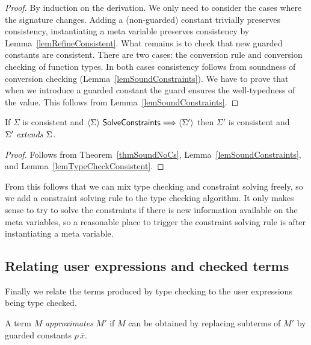 \begin{proof}
\if {}
    By induction on the derivation. We only need to consider the cases where
    the signature changes. Adding a (non-guarded) constant trivially preserves
    consistency, instantiating a meta variable preserves consistency by
    Lemma~\ref{lemRefineConsistent}. What remains is to check that new guarded
    constants are consistent. There are two cases: the conversion rule and
    conversion checking of function types. In both cases consistency follows
    from soundness of conversion checking (Lemma~\ref{lemSoundConstraints}).
\else
    We have to prove that when we introduce a guarded constant the guard
    ensures the well-typedness of the value. This follows from
    Lemma~\ref{lemSoundConstraints}.
\fi
\end{proof}

\begin{lemma} \label{lemSolveConsistent}
    If $\Sigma$ is consistent and $\langle {\Sigma} \rangle ~ {\mathsf{SolveConstraints}} \Longrightarrow \langle {\Sigma'} \rangle$ then $\Sigma'$ is consistent and ${\Sigma'} ~ \mathit{extends} ~ {\Sigma}$.
\end{lemma}

\begin{proof}
    Follows from Theorem~\ref{thmSoundNoCs}, Lemma~\ref{lemSoundConstraints},
    and Lemma~\ref{lemTypeCheckConsistent}.
\end{proof}

From this follows that we can mix type checking and constraint solving freely,
so we add a constraint solving rule to the type checking algorithm. It only
makes sense to try to solve the constraints if there is new information
available on the meta variables, so a reasonable place to trigger the
constraint solving rule is after instantiating a meta variable.

\subsection{Relating user expressions and checked terms}

Finally we relate the terms produced by type checking to the user expressions
being type checked. 

\begin{definition}[Approximation]
    A term $M$ {\em approximates} $M'$ if $M$ can be obtained by replacing
    subterms of $M'$ by guarded constants $p \, \bar x$.
\end{definition}


